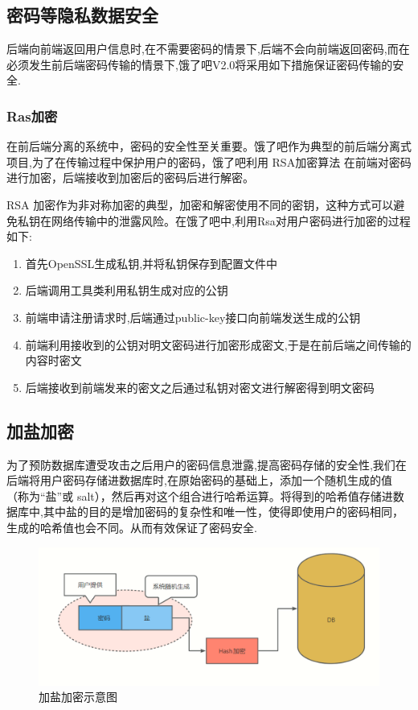 \subsection{密码等隐私数据安全}
后端向前端返回用户信息时,在不需要密码的情景下,后端不会向前端返回密码,而在必须发生前后端密码传输的情景下,饿了吧V2.0将采用如下措施保证密码传输的安全.
\subsubsection{Ras加密}
在前后端分离的系统中，密码的安全性至关重要。饿了吧作为典型的前后端分离式项目,为了在传输过程中保护用户的密码，饿了吧利用 RSA加密算法 在前端对密码进行加密，后端接收到加密后的密码后进行解密。
    
RSA 加密作为非对称加密的典型，加密和解密使用不同的密钥，这种方式可以避免私钥在网络传输中的泄露风险。在饿了吧中,利用Rsa对用户密码进行加密的过程如下:
\begin{enumerate}
    \item 首先OpenSSL生成私钥,并将私钥保存到配置文件中
    \item 后端调用工具类利用私钥生成对应的公钥
    \item 前端申请注册请求时,后端通过public-key接口向前端发送生成的公钥
    \item 前端利用接收到的公钥对明文密码进行加密形成密文,于是在前后端之间传输的内容时密文
    \item 后端接收到前端发来的密文之后通过私钥对密文进行解密得到明文密码
\end{enumerate}

\subsection{加盐加密}
为了预防数据库遭受攻击之后用户的密码信息泄露,提高密码存储的安全性,我们在后端将用户密码存储进数据库时,在原始密码的基础上，添加一个随机生成的值（称为“盐”或 salt），然后再对这个组合进行哈希运算。将得到的哈希值存储进数据库中,其中盐的目的是增加密码的复杂性和唯一性，使得即使用户的密码相同，生成的哈希值也会不同。从而有效保证了密码安全.

\begin{figure}[h]
    \centering
        \includegraphics[width=\linewidth]{pics/加盐加密.png}
    \caption{加盐加密示意图}
    \label{fig:jyjm}
\end{figure}

